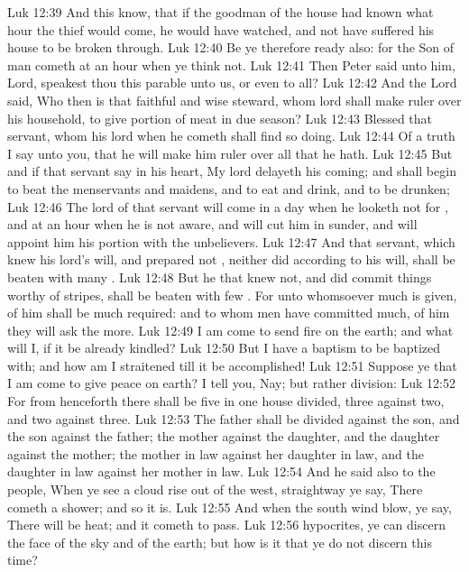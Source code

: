 \vs Luk 12:39 And this know, that if the goodman of the house had known what hour the thief would come, he would have watched, and not have suffered his house to be broken through.
\vs Luk 12:40 Be ye therefore ready also: for the Son of man cometh at an hour when ye think not.
\vs Luk 12:41 Then Peter said unto him, Lord, speakest thou this parable unto us, or even to all?
\vs Luk 12:42 And the Lord said, Who then is that faithful and wise steward, whom  lord shall make ruler over his household, to give  portion of meat in due season?
\vs Luk 12:43 Blessed  that servant, whom his lord when he cometh shall find so doing.
\vs Luk 12:44 Of a truth I say unto you, that he will make him ruler over all that he hath.
\vs Luk 12:45 But and if that servant say in his heart, My lord delayeth his coming; and shall begin to beat the menservants and maidens, and to eat and drink, and to be drunken;
\vs Luk 12:46 The lord of that servant will come in a day when he looketh not for , and at an hour when he is not aware, and will cut him in sunder, and will appoint him his portion with the unbelievers.
\vs Luk 12:47 And that servant, which knew his lord's will, and prepared not , neither did according to his will, shall be beaten with many .
\vs Luk 12:48 But he that knew not, and did commit things worthy of stripes, shall be beaten with few . For unto whomsoever much is given, of him shall be much required: and to whom men have committed much, of him they will ask the more.
\vs Luk 12:49 I am come to send fire on the earth; and what will I, if it be already kindled?
\vs Luk 12:50 But I have a baptism to be baptized with; and how am I straitened till it be accomplished!
\vs Luk 12:51 Suppose ye that I am come to give peace on earth? I tell you, Nay; but rather division:
\vs Luk 12:52 For from henceforth there shall be five in one house divided, three against two, and two against three.
\vs Luk 12:53 The father shall be divided against the son, and the son against the father; the mother against the daughter, and the daughter against the mother; the mother in law against her daughter in law, and the daughter in law against her mother in law.
\vs Luk 12:54 And he said also to the people, When ye see a cloud rise out of the west, straightway ye say, There cometh a shower; and so it is.
\vs Luk 12:55 And when  the south wind blow, ye say, There will be heat; and it cometh to pass.
\vs Luk 12:56  hypocrites, ye can discern the face of the sky and of the earth; but how is it that ye do not discern this time?

